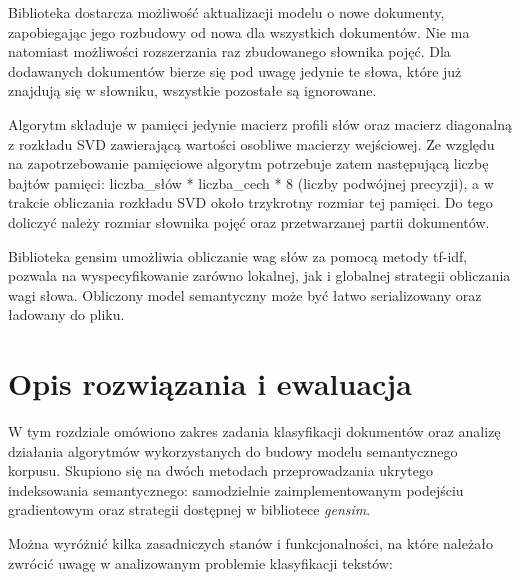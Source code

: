 \documentclass{pracamgr}
\begin{document}
Biblioteka dostarcza możliwość aktualizacji modelu o nowe dokumenty, zapobiegając jego rozbudowy od nowa dla wszystkich dokumentów. Nie ma natomiast możliwości rozszerzania raz zbudowanego słownika pojęć. Dla dodawanych dokumentów bierze się pod uwagę jedynie te słowa, które już znajdują się w słowniku, wszystkie pozostałe są ignorowane.

Algorytm składuje w pamięci jedynie macierz profili słów oraz macierz diagonalną z rozkładu SVD zawierającą wartości osobliwe macierzy wejściowej.  Ze względu na zapotrzebowanie pamięciowe algorytm potrzebuje zatem następującą liczbę bajtów pamięci: liczba\_słów * liczba\_cech * 8 (liczby podwójnej precyzji), a w trakcie obliczania rozkładu SVD około trzykrotny rozmiar tej pamięci. Do tego doliczyć należy rozmiar słownika pojęć oraz przetwarzanej partii dokumentów.

Biblioteka gensim umożliwia obliczanie wag słów za pomocą metody tf-idf, pozwala na wyspecyfikowanie zarówno lokalnej, jak i globalnej strategii obliczania wagi słowa. Obliczony model semantyczny może być łatwo serializowany oraz ładowany do pliku.


\chapter{Opis rozwiązania i ewaluacja}

W tym rozdziale omówiono zakres zadania klasyfikacji dokumentów oraz analizę działania algorytmów wykorzystanych do budowy modelu semantycznego korpusu. Skupiono się na dwóch metodach przeprowadzania ukrytego indeksowania semantycznego: samodzielnie zaimplementowanym podejściu gradientowym oraz strategii dostępnej w bibliotece \textit{gensim}.

Można wyróżnić kilka zasadniczych stanów i funkcjonalności, na które należało zwrócić uwagę w analizowanym problemie klasyfikacji tekstów:
\end{document}
